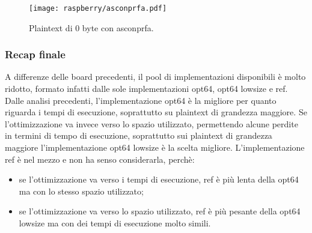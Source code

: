 \begin{figure}[H]
    \centering
    \texttt{[image: raspberry/asconprfa.pdf]}
    \caption{Plaintext di 0 byte con asconprfa.}
\end{figure}

\subsubsection{Recap finale}

A differenze delle board precedenti, il pool di implementazioni disponibili è molto ridotto, formato infatti dalle sole implementazioni opt64, opt64 lowsize e ref. Dalle analisi precedenti, l'implementazione opt64 è la migliore per quanto riguarda i tempi di esecuzione, soprattutto su plaintext di grandezza maggiore. Se l'ottimizzazione va invece verso lo spazio utilizzato, permettendo alcune perdite in termini di tempo di esecuzione, soprattutto sui plaintext di grandezza maggiore l'implementazione opt64 lowsize è la scelta migliore. L'implementazione ref è nel mezzo e non ha senso considerarla, perchè: \begin{itemize}
    \item se l'ottimizzazione va verso i tempi di esecuzione, ref è più lenta della opt64 ma con lo stesso spazio utilizzato;
    \item se l'ottimizzazione va verso lo spazio utilizzato, ref è più pesante della opt64 lowsize ma con dei tempi di esecuzione molto simili.
\end{itemize}

